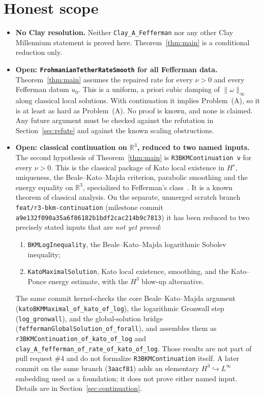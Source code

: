 \documentclass[11pt,a4paper]{article}
\theoremstyle{definition}
\theoremstyle{remark}
\newcommand{\R}{\mathbb{R}}
\newcommand{\lean}[1]{\texttt{#1}}
\begin{document}
\section{Honest scope}\label{sec:scope}

\begin{itemize}
\item \textbf{No Clay resolution.} Neither \lean{Clay\_A\_Fefferman} nor any other Clay Millennium statement is proved here. Theorem~\ref{thm:main} is a conditional reduction only.
\item \textbf{Open: \lean{FrohmanianTetherRateSmooth} for all Fefferman data.} Theorem~\ref{thm:main} assumes the repaired rate for every $\nu>0$ and every Fefferman datum $u_0$. This is a uniform, a priori cubic damping of $\|\omega\|_\infty$ along classical local solutions. With continuation it implies Problem~(A), so it is at least as hard as Problem~(A). No proof is known, and none is claimed. Any future argument must be checked against the refutation in Section~\ref{sec:refute} and against the known scaling obstructions.
\item \textbf{Open: classical continuation on $\R^3$, reduced to two named inputs.} The second hypothesis of Theorem~\ref{thm:main} is \lean{R3BKMContinuation ν} for every $\nu>0$. This is the classical package of Kato local existence in $H^s$, uniqueness, the Beale--Kato--Majda criterion, parabolic smoothing and the energy equality on $\R^3$, specialized to Fefferman's class~\cite{BKM,Kato}. It is a known theorem of classical analysis. On the separate, unmerged scratch branch \lean{feat/r3-bkm-continuation} (milestone commit \lean{a9e132f090a35a6f86182b1bdf2cac214b9c7813}) it has been reduced to two precisely stated inputs that are \emph{not yet proved}:
  \begin{enumerate}[label=(\alph*)]
  \item \lean{BKMLogInequality}, the Beale--Kato--Majda logarithmic Sobolev inequality;
  \item \lean{KatoMaximalSolution}, Kato local existence, smoothing, and the Kato--Ponce energy estimate, with the $H^3$ blow-up alternative.
  \end{enumerate}
  The same commit kernel-checks the core Beale--Kato--Majda argument (\lean{katoBKMMaximal\_of\_kato\_of\_log}), the logarithmic Gronwall step (\lean{log\_gronwall}), and the global-solution bridge (\lean{feffermanGlobalSolution\_of\_forall}), and assembles them as \lean{r3BKMContinuation\_of\_kato\_of\_log} and \lean{clay\_A\_fefferman\_of\_rate\_of\_kato\_of\_log}. Those results are not part of pull request \#4 and do not formalize \lean{R3BKMContinuation} itself. A later commit on the same branch (\lean{3aacf81}) adds an elementary $H^3\hookrightarrow L^\infty$ embedding used as a foundation; it does not prove either named input. Details are in Section~\ref{sec:continuation}.

\end{itemize}
\end{document}
